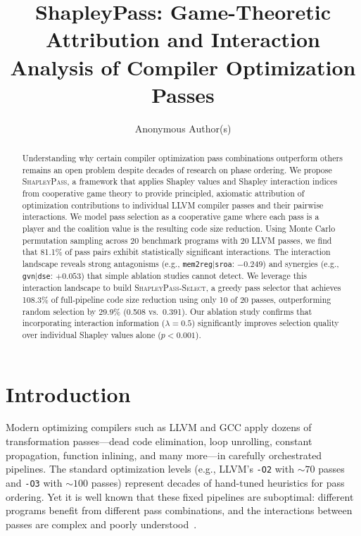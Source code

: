 \documentclass{article}
\title{ShapleyPass: Game-Theoretic Attribution and Interaction Analysis of Compiler Optimization Passes}
\author{
  Anonymous Author(s)
}
\begin{document}
\maketitle

\begin{abstract}
Understanding why certain compiler optimization pass combinations outperform others remains an open problem despite decades of research on phase ordering. We propose \textsc{ShapleyPass}, a framework that applies Shapley values and Shapley interaction indices from cooperative game theory to provide principled, axiomatic attribution of optimization contributions to individual LLVM compiler passes and their pairwise interactions. We model pass selection as a cooperative game where each pass is a player and the coalition value is the resulting code size reduction. Using Monte Carlo permutation sampling across 20 benchmark programs with 20 LLVM passes, we find that 81.1\% of pass pairs exhibit statistically significant interactions. The interaction landscape reveals strong antagonisms (e.g., \texttt{mem2reg}$|$\texttt{sroa}: $-0.249$) and synergies (e.g., \texttt{gvn}$|$\texttt{dse}: $+0.053$) that simple ablation studies cannot detect. We leverage this interaction landscape to build \textsc{ShapleyPass-Select}, a greedy pass selector that achieves 108.3\% of full-pipeline code size reduction using only 10 of 20 passes, outperforming random selection by 29.9\% (0.508 vs.\ 0.391). Our ablation study confirms that incorporating interaction information ($\lambda=0.5$) significantly improves selection quality over individual Shapley values alone ($p < 0.001$).
\end{abstract}

\section{Introduction}

Modern optimizing compilers such as LLVM and GCC apply dozens of transformation passes---dead code elimination, loop unrolling, constant propagation, function inlining, and many more---in carefully orchestrated pipelines. The standard optimization levels (e.g., LLVM's \texttt{-O2} with ${\sim}70$ passes and \texttt{-O3} with ${\sim}100$ passes) represent decades of hand-tuned heuristics for pass ordering. Yet it is well known that these fixed pipelines are suboptimal: different programs benefit from different pass combinations, and the interactions between passes are complex and poorly understood~\citep{whitfield1997approach}.
\end{document}
